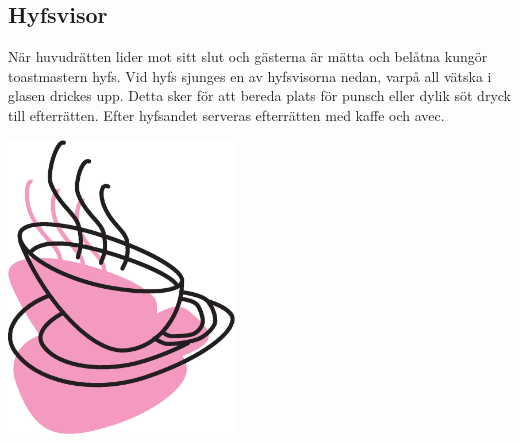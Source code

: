 \begin{flushleft}
\section{Hyfsvisor}
{\Large
När huvudrätten lider mot sitt slut och gästerna är mätta och belåtna
kungör toastmastern hyfs. Vid hyfs sjunges en av
hyfsvisorna nedan, varpå all vätska i glasen drickes upp. Detta sker för att bereda plats för punsch eller dylik söt dryck till
efterrätten. Efter hyfsandet serveras efterrätten med kaffe och avec.}
\end{flushleft}

\vspace{2cm}
\begin{center}
\includegraphics[width=6cm]{bilder/hyfs.eps}
\end{center}
\newpage

